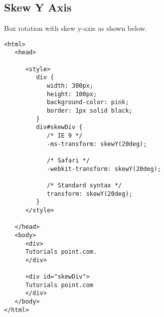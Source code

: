 \documentclass[a4paper,oneside]{book}
\numberwithin{equation}{chapter}
\begin{document}
\subsection{Skew Y Axis}
Box rotation with skew y-axis as shown below.
\begin{verbatim}
<html>
   <head>
   
      <style>
         div {
            width: 300px;
            height: 100px;
            background-color: pink;
            border: 1px solid black;
         }
         div#skewDiv {
            /* IE 9 */
            -ms-transform: skewY(20deg); 
            
            /* Safari */
            -webkit-transform: skewY(20deg); 
            
            /* Standard syntax */	
            transform: skewY(20deg);
         }
      </style>
      
   </head>
   <body>
      <div>
      Tutorials point.com.
      </div>
      
      <div id="skewDiv">
      Tutorials point.com
      </div>
   </body>
</html>
\end{verbatim}
\end{document}
